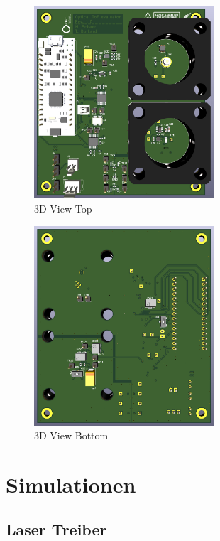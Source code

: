 \documentclass[11pt,a4paper,hidelinks]{article}
\begin{document}
\begin{figure}[H]
    \centering
    \includegraphics[width=0.6\textwidth]{graphics/3d_top.png}
    \caption{3D View Top}\label{fig:3d_top}
\end{figure}

\begin{figure}[H]
    \centering
    \includegraphics[width=0.6\textwidth]{graphics/3d_bottom.png}
    \caption{3D View Bottom}\label{fig:3d_bottom}
\end{figure}

\pagebreak

\section{Simulationen}

\subsection{Laser Treiber}
\end{document}
